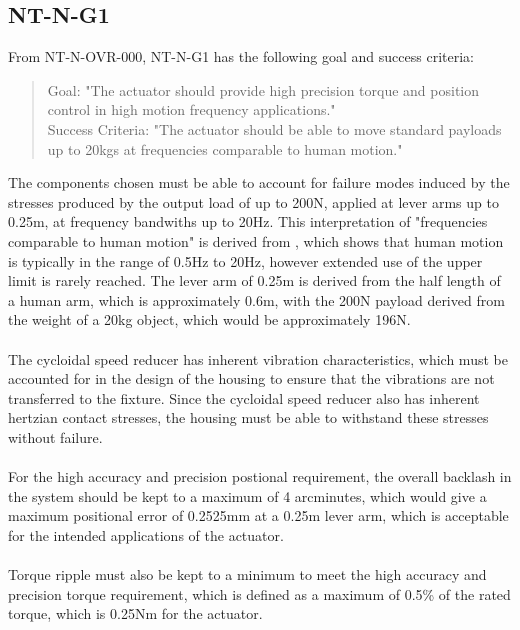 \documentclass[confidential]{../../../classes/nervtech-engdoc}
\begin{document}
\subsection{NT-N-G1}
From NT-N-OVR-000, NT-N-G1 has the following goal and success criteria:
\begin{quote}
  Goal: "The actuator should provide high precision torque and position control in high motion frequency applications."
  \\
  Success Criteria: "The actuator should be able to move standard payloads up to 20kgs at frequencies comparable to human motion."
\end{quote}
The components chosen must be able to account for failure modes induced by the stresses produced by the output load of up to 200N, applied at lever arms up to 0.25m, at frequency bandwiths up to 20Hz.
This interpretation of "frequencies comparable to human motion" is derived from \cite{HumanFrequencies}, which shows that human motion is typically in the range of 0.5Hz to 20Hz, however extended use of the upper limit is rarely reached.
The lever arm of 0.25m is derived from the half length of a human arm, which is approximately 0.6m, with the 200N payload derived from the weight of a 20kg object, which would be approximately 196N.
\\\\
The cycloidal speed reducer has inherent vibration characteristics, which must be accounted for in the design of the housing to ensure that the vibrations are not transferred to the fixture.
Since the cycloidal speed reducer also has inherent hertzian contact stresses, the housing must be able to withstand these stresses without failure.
\\\\
For the high accuracy and precision postional requirement, the overall backlash in the system should be kept to a maximum of 4 arcminutes, which would give a maximum positional error of 0.2525mm at a 0.25m lever arm, which is acceptable for the intended applications of the actuator.
\\\\
Torque ripple must also be kept to a minimum to meet the high accuracy and precision torque requirement, which is defined as a maximum of 0.5\% of the rated torque, which is 0.25Nm for the actuator.
\end{document}
